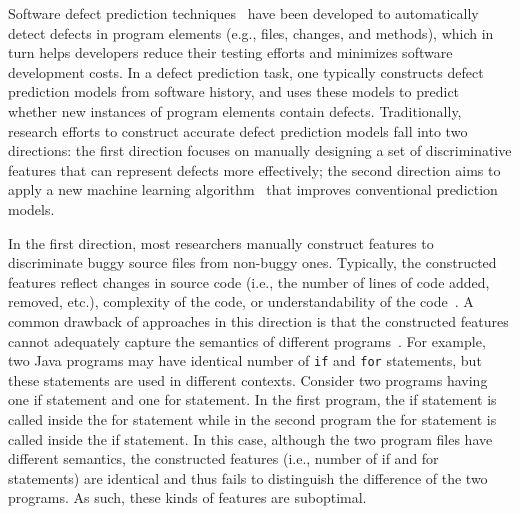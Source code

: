 
Software defect prediction techniques~\cite{hassan2009predicting, jiang2013personalized} have been developed to automatically detect defects in program elements (e.g., files, changes, and methods), which in turn helps developers reduce their testing efforts and minimizes
software development costs. 
In a defect prediction task, one typically constructs
defect prediction models from software history, and uses these models to predict whether new instances of program elements contain defects. 
Traditionally, research efforts to construct accurate defect prediction models fall into two directions:
the first direction focuses on manually designing a set of discriminative features that can represent defects more effectively; the second direction aims to apply a new machine learning algorithm~\cite{bishop2006pattern} that improves conventional prediction models. 

In the first direction, most researchers manually construct features to discriminate buggy source files from non-buggy ones. Typically, the constructed features reflect changes in source code (i.e., the number of lines of code added, removed, etc.), complexity of the code, or understandability of the code~\cite{jiang2013personalized, harrison1998evaluation}. 
A common drawback of approaches in this direction is that the constructed features cannot adequately capture the semantics of different programs~\cite{wang2016automatically}. For example, two Java programs may have identical number of \texttt{if} and \texttt{for} statements, but these statements are used in different contexts. Consider two programs having one if statement and one for statement. In the first program, the if statement is called inside the for statement while in the second program the for statement is called inside the if statement.  In this case, although the two program files have different semantics, the constructed features (i.e., number of if and for statements) are identical  and thus fails to distinguish the difference of the two programs. As such, these kinds of features are suboptimal.

